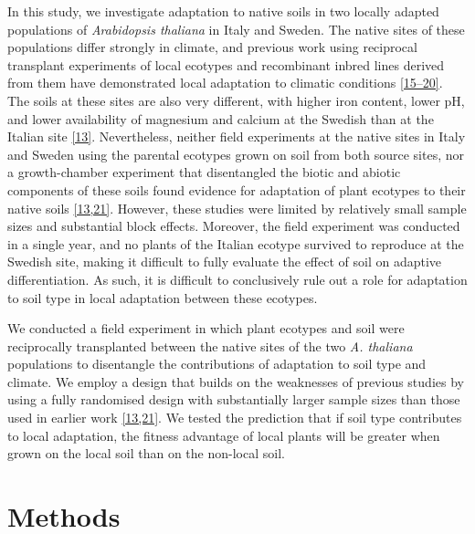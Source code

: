 \documentclass[twocolumn,twoside,lettersize]{article}
\begin{document}
In this study, we investigate adaptation to native soils in two locally adapted populations of \textit{Arabidopsis thaliana} in Italy and Sweden. The native sites of these populations differ strongly in climate, and previous work using reciprocal transplant experiments of local ecotypes and recombinant inbred lines derived from them have demonstrated local adaptation to climatic conditions \href{https://paperpile.com/c/ktzZ5s/YZ2m+oZRG+BGgH+dJKM+UCR5+w7LY}{[15–20]}. The soils at these sites are also very different, with higher iron content, lower pH, and lower availability of magnesium and calcium at the Swedish than at the Italian site \href{https://paperpile.com/c/ktzZ5s/1D9V}{[13]}. Nevertheless, neither field experiments at the native sites in Italy and Sweden using the parental ecotypes grown on soil from both source sites, nor a growth-chamber experiment that disentangled the biotic and abiotic components of these soils found evidence for adaptation of plant ecotypes to their native soils \href{https://paperpile.com/c/ktzZ5s/1D9V+zDkv}{[13,21]}. However, these studies were limited by relatively small sample sizes and substantial block effects. Moreover, the field experiment was conducted in a single year, and no plants of the Italian ecotype survived to reproduce at the Swedish site, making it difficult to fully evaluate the effect of soil on adaptive differentiation. As such, it is difficult to conclusively rule out a role for adaptation to soil type in local adaptation between these ecotypes.

We conducted a field experiment in which plant ecotypes and soil were reciprocally transplanted between the native sites of the two \textit{A. thaliana} populations to disentangle the contributions of adaptation to soil type and climate. We employ a design that builds on the weaknesses of previous studies by using a fully randomised design with substantially larger sample sizes than those used in earlier work \href{https://paperpile.com/c/ktzZ5s/1D9V+zDkv}{[13,21]}. We tested the prediction that if soil type contributes to local adaptation, the fitness advantage of local plants will be greater when grown on the local soil than on the non-local soil.

\section*{Methods}
\end{document}
